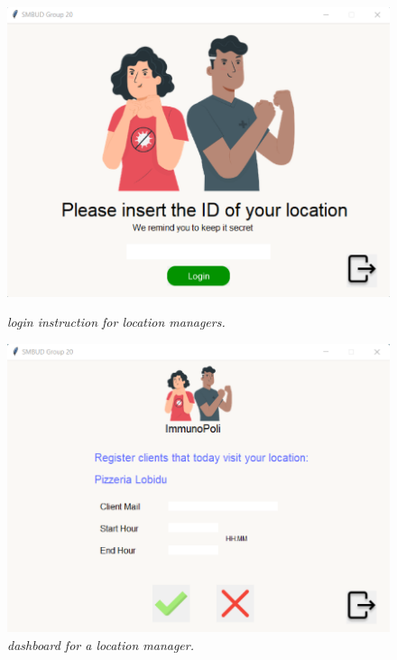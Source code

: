 \begin{figure}[h]
    \centering
    \begin{minipage}{0.485\textwidth}
        \centering
        \includegraphics[width=\textwidth]{images/application_screenshots/location_manager_login.png} 
        \caption{\textit{login instruction for location managers.}}
    \end{minipage}\hfill
    \begin{minipage}{0.485\textwidth}
        \centering
        \includegraphics[width=\textwidth]{images/application_screenshots/register_visit.png} 
        \caption{\textit{dashboard for a location manager.}}
    \end{minipage}
\end{figure}




